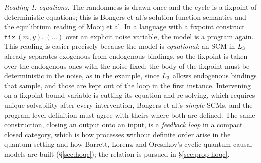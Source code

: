\emph{Reading 1: equations.} The randomness is drawn once and the cycle is a fixpoint of deterministic equations; this is Bongers et al.'s solution-function semantics and the equilibrium reading of Mooij et al. In a language with a fixpoint construct $\mathtt{fix}\ (m,y).\ (\dots)$ over an explicit noise variable, the model is a program again. This reading is easier precisely because the model is \emph{equational}: an SCM in $L_{3}$ already separates exogenous from endogenous bindings, so the fixpoint is taken over the endogenous ones with the noise fixed; the body of the fixpoint must be deterministic in the noise, as in the example, since $L_{3}$ allows endogenous bindings that sample, and those are kept out of the loop in the first instance. Intervening on a fixpoint-bound variable is cutting its equation and re-solving, which requires unique solvability after every intervention, Bongers et al.'s \emph{simple} SCMs, and the program-level definition must agree with theirs where both are defined. The same construction, closing an output onto an input, is a \emph{feedback loop} in a compact closed category, which is how processes without definite order arise in the quantum setting and how Barrett, Lorenz and Oreshkov's cyclic quantum causal models are built (\S\ref{sec:hoqc}); the relation is pursued in \S\ref{sec:prop-hoqc}.

